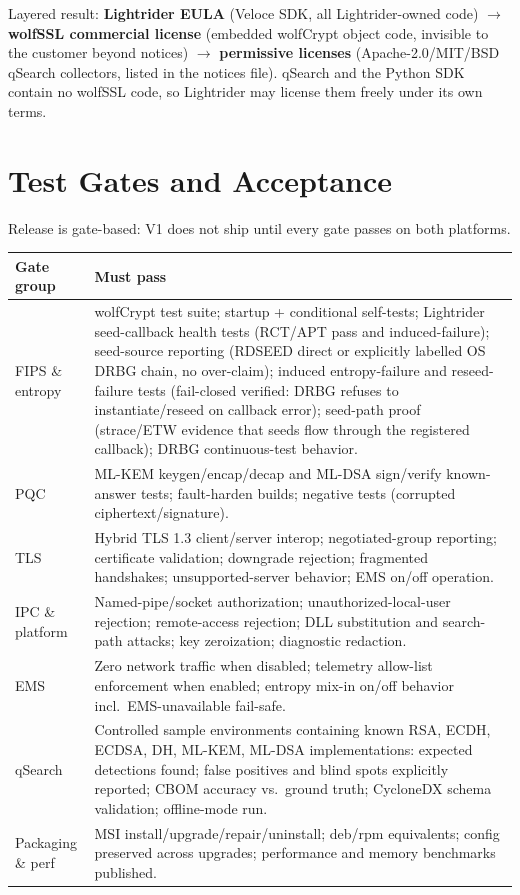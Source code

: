 \documentclass[10pt]{article}
\begin{document}
Layered result: \textbf{Lightrider EULA} (Veloce SDK, all Lightrider-owned code)
$\rightarrow$ \textbf{wolfSSL commercial license} (embedded wolfCrypt object code,
invisible to the customer beyond notices) $\rightarrow$ \textbf{permissive licenses}
(Apache-2.0/MIT/BSD qSearch collectors, listed in the notices file). qSearch and the
Python SDK contain no wolfSSL code, so Lightrider may license them freely under its own
terms.

\section{Test Gates and Acceptance}\label{sec:gates}

Release is gate-based: V1 does not ship until every gate passes on both platforms.

\begin{small}
\begin{tabularx}{\textwidth}{@{}lL@{}}
\toprule
\textbf{Gate group} & \textbf{Must pass} \\
\midrule
FIPS \& entropy & wolfCrypt test suite; startup + conditional self-tests; Lightrider
  seed-callback health tests (RCT/APT pass and induced-failure); seed-source reporting
  (RDSEED direct or explicitly labelled OS DRBG chain, no over-claim); induced
  entropy-failure and reseed-failure tests (fail-closed verified: DRBG refuses to
  instantiate/reseed on callback error); seed-path proof (strace/ETW evidence that seeds
  flow through the registered callback); DRBG continuous-test behavior. \\
PQC & ML-KEM keygen/encap/decap and ML-DSA sign/verify known-answer tests; fault-harden
  builds; negative tests (corrupted ciphertext/signature). \\
TLS & Hybrid TLS 1.3 client/server interop; negotiated-group reporting; certificate
  validation; downgrade rejection; fragmented handshakes; unsupported-server behavior;
  EMS on/off operation. \\
IPC \& platform & Named-pipe/socket authorization; unauthorized-local-user rejection;
  remote-access rejection; DLL substitution and search-path attacks; key zeroization;
  diagnostic redaction. \\
EMS & Zero network traffic when disabled; telemetry allow-list enforcement when enabled;
  entropy mix-in on/off behavior incl.\ EMS-unavailable fail-safe. \\
qSearch & Controlled sample environments containing known RSA, ECDH, ECDSA, DH, ML-KEM,
  ML-DSA implementations: expected detections found; false positives and blind spots
  explicitly reported; CBOM accuracy vs.\ ground truth; CycloneDX schema validation;
  offline-mode run. \\
Packaging \& perf & MSI install/upgrade/repair/uninstall; deb/rpm equivalents;
  config preserved across upgrades; performance and memory benchmarks published. \\
\bottomrule
\end{tabularx}
\end{small}
\end{document}
